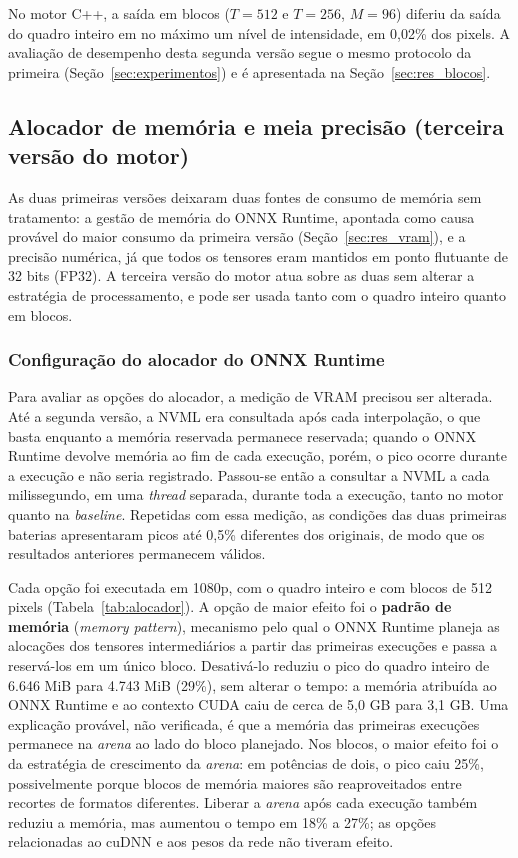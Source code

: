 \documentclass[
    12pt,                %
    openright,           %
    oneside,             %
    a4paper,             %
    english,             %
    brazil               %
]{abntex2}
\begin{document}
No motor C++, a saída em blocos ($T = 512$ e $T = 256$, $M = 96$) diferiu da saída do quadro inteiro em no máximo um nível de intensidade, em 0,02\% dos pixels. A avaliação de desempenho desta segunda versão segue o mesmo protocolo da primeira (Seção~\ref{sec:experimentos}) e é apresentada na Seção~\ref{sec:res_blocos}.

\subsection{Alocador de memória e meia precisão (terceira versão do motor)}
\label{sec:fp16}

As duas primeiras versões deixaram duas fontes de consumo de memória sem tratamento: a gestão de memória do ONNX Runtime, apontada como causa provável do maior consumo da primeira versão (Seção~\ref{sec:res_vram}), e a precisão numérica, já que todos os tensores eram mantidos em ponto flutuante de 32 bits (FP32). A terceira versão do motor atua sobre as duas sem alterar a estratégia de processamento, e pode ser usada tanto com o quadro inteiro quanto em blocos.

\subsubsection{Configuração do alocador do ONNX Runtime}

Para avaliar as opções do alocador, a medição de VRAM precisou ser alterada. Até a segunda versão, a NVML era consultada após cada interpolação, o que basta enquanto a memória reservada permanece reservada; quando o ONNX Runtime devolve memória ao fim de cada execução, porém, o pico ocorre durante a execução e não seria registrado. Passou-se então a consultar a NVML a cada milissegundo, em uma \textit{thread} separada, durante toda a execução, tanto no motor quanto na \textit{baseline}. Repetidas com essa medição, as condições das duas primeiras baterias apresentaram picos até 0,5\% diferentes dos originais, de modo que os resultados anteriores permanecem válidos.

Cada opção foi executada em 1080p, com o quadro inteiro e com blocos de 512 pixels (Tabela~\ref{tab:alocador}). A opção de maior efeito foi o \textbf{padrão de memória} (\textit{memory pattern}), mecanismo pelo qual o ONNX Runtime planeja as alocações dos tensores intermediários a partir das primeiras execuções e passa a reservá-los em um único bloco. Desativá-lo reduziu o pico do quadro inteiro de 6.646 MiB para 4.743 MiB (29\%), sem alterar o tempo: a memória atribuída ao ONNX Runtime e ao contexto CUDA caiu de cerca de 5,0 GB para 3,1 GB. Uma explicação provável, não verificada, é que a memória das primeiras execuções permanece na \textit{arena} ao lado do bloco planejado. Nos blocos, o maior efeito foi o da estratégia de crescimento da \textit{arena}: em potências de dois, o pico caiu 25\%, possivelmente porque blocos de memória maiores são reaproveitados entre recortes de formatos diferentes. Liberar a \textit{arena} após cada execução também reduziu a memória, mas aumentou o tempo em 18\% a 27\%; as opções relacionadas ao cuDNN e aos pesos da rede não tiveram efeito.
\end{document}
